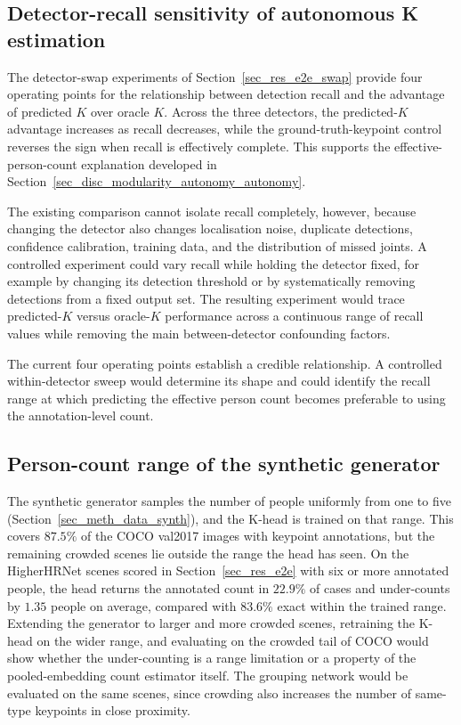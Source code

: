 \subsection{Detector-recall sensitivity of autonomous K estimation}
\label{sec_conc_future_recall}

The detector-swap experiments of Section~\ref{sec_res_e2e_swap}
provide four operating points for the relationship between detection
recall and the advantage of predicted $K$ over oracle $K$.
Across the three detectors, the predicted-$K$ advantage increases as
recall decreases,
while the ground-truth-keypoint control reverses the sign when recall
is effectively complete.
This supports the effective-person-count explanation developed in
Section~\ref{sec_disc_modularity_autonomy_autonomy}.

The existing comparison cannot isolate recall completely, however,
because changing the detector also changes localisation noise,
duplicate detections,
confidence calibration,
training data,
and the distribution of missed joints.
A controlled experiment could vary recall while holding the detector
fixed,
for example by changing its detection threshold or by systematically
removing detections from a fixed output set.
The resulting experiment would trace predicted-$K$ versus oracle-$K$
performance across a continuous range of recall values while removing
the main between-detector confounding factors.

The current four operating points establish a credible relationship.
A controlled within-detector sweep would determine its shape and could
identify the recall range at which predicting the effective person count
becomes preferable to using the annotation-level count.

\subsection{Person-count range of the synthetic generator}
\label{sec_conc_future_krange}

The synthetic generator samples the number of people uniformly from one to five
(Section~\ref{sec_meth_data_synth}),
and the K-head is trained on that range.
This covers $87.5\%$ of the COCO val2017 images with keypoint annotations,
but the remaining crowded scenes lie outside the range the head has seen.
On the HigherHRNet scenes scored in Section~\ref{sec_res_e2e} with six or more annotated people,
the head returns the annotated count in $22.9\%$ of cases and under-counts by $1.35$ people on average,
compared with $83.6\%$ exact within the trained range.
Extending the generator to larger and more crowded scenes,
retraining the K-head on the wider range,
and evaluating on the crowded tail of COCO would show whether the under-counting is a range limitation
or a property of the pooled-embedding count estimator itself.
The grouping network would be evaluated on the same scenes,
since crowding also increases the number of same-type keypoints in close proximity.

